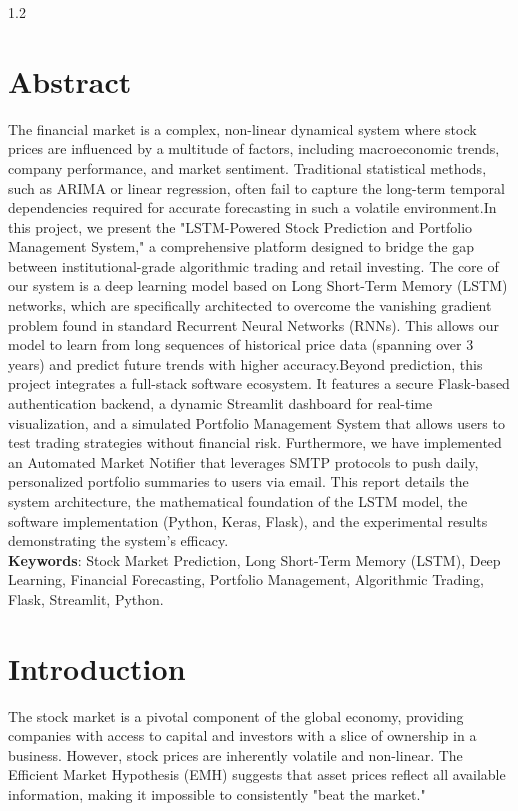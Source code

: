 \documentclass[12pt, a4paper]{report}
\begin{document}
\begin{spacing}{1.2}
\chapter*{Abstract}
\vspace{-0.5cm}
\titlerule
\vspace{0.2cm}
The financial market is a complex, non-linear dynamical system where stock prices are influenced by a multitude of factors, including macroeconomic trends, company performance, and market sentiment. Traditional statistical methods, such as ARIMA or linear regression, often fail to capture the long-term temporal dependencies required for accurate forecasting in such a volatile environment.In this project, we present the "LSTM-Powered Stock Prediction and Portfolio Management System," a comprehensive platform designed to bridge the gap between institutional-grade algorithmic trading and retail investing. The core of our system is a deep learning model based on Long Short-Term Memory (LSTM) networks, which are specifically architected to overcome the vanishing gradient problem found in standard Recurrent Neural Networks (RNNs). This allows our model to learn from long sequences of historical price data (spanning over 3 years) and predict future trends with higher accuracy.Beyond prediction, this project integrates a full-stack software ecosystem. It features a secure Flask-based authentication backend, a dynamic Streamlit dashboard for real-time visualization, and a simulated Portfolio Management System that allows users to test trading strategies without financial risk. Furthermore, we have implemented an Automated Market Notifier that leverages SMTP protocols to push daily, personalized portfolio summaries to users via email. This report details the system architecture, the mathematical foundation of the LSTM model, the software implementation (Python, Keras, Flask), and the experimental results demonstrating the system's efficacy.\\ \textbf{Keywords}: Stock Market Prediction, Long Short-Term Memory (LSTM), Deep Learning, Financial Forecasting, Portfolio Management, Algorithmic Trading, Flask, Streamlit, Python.

\newpage
\setcounter{page}{1} 
\chapter{Introduction}
\vspace{-0.5cm}
The stock market is a pivotal component of the global economy, providing companies with access to capital and investors with a slice of ownership in a business. However, stock prices are inherently volatile and non-linear. The Efficient Market Hypothesis (EMH) suggests that asset prices reflect all available information, making it impossible to consistently "beat the market." 


\end{spacing}
\end{document}
